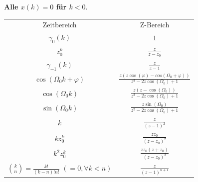 \documentclass[10pt,a4paper]{article}
\begin{document}
\textbf{Alle $x(k)=0$ für $k < 0$}.
\begin{center}
  \bgroup
  \def\arraystretch{1.5}
  \begin{tabular}{ | c | c | }
  \cline{1-2}
          \rowcolor{black!15}
          Zeitbereich & Z-Bereich \\
  
  \cline{1-2}
          $\gamma_0(k)$ &
          $1$ \\

  \cline{1-2}
          $z_0^k$ & $\frac{z}{z-z_0}$ \\

  \cline{1-2}
          $\gamma_{-1}(k)$ & $\frac{z}{z-1}$\\

  \cline{1-2}
        $\cos(\Omega_0k+\varphi)$ & $\frac{z(z\cos(\varphi)-cos(\Omega_0+\varphi))}{z^2-2z\cos(\Omega_0)+1}$ \\ 

  \cline{1-2}
          $\cos(\Omega_0k)$ & $\frac{z(z-\cos(\Omega_0))}{z^2-2z\cos(\Omega_0)+1}$ \\ 
  
  \cline{1-2}
          $\sin(\Omega_0k)$ & $\frac{z\sin(\Omega_0)}{z^2-2z\cos(\Omega_0)+1}$ \\  
  
  \cline{1-2}
          $k$ & $\frac{z}{(z-1)^2}$ \\ 

  \cline{1-2}
          $kz_0^k$ & $\frac{zz_0}{(z-z_0)^2}$\\ 

  \cline{1-2}
          $k^2z_0^k$ & $\frac{zz_0(z+z_0)}{(z-z_0)^3}$ \\  

  \cline{1-2}
          \shortstack{$\binom{k}{n}=\frac{k!}{(k-n)!n!}$ \\ $(=0, \forall{}k<n)$} & $\frac{z}{(z-1)^{n+1}}$ \\
  
  \cline{1-2}
  \end{tabular}
  \egroup
\end{center}

\end{document}

